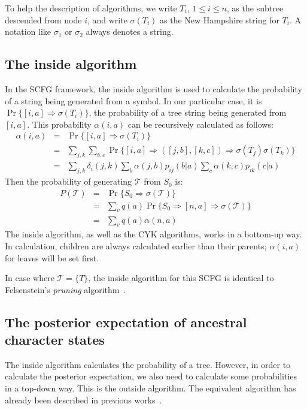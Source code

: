 \documentclass[pdftex,11pt]{article}
\begin{document}
To help the description of algorithms, we write $T_i$, $1\leq i\leq n$,
as the subtree descended from node $i$, and write $\sigma(T_i)$ as the
New Hampshire string for $T_i$.  A notation like $\sigma_1$ or
$\sigma_2$ always denotes a string.

\subsection{The inside algorithm}
In the SCFG framework, the inside algorithm is used to calculate the
probability of a string being generated from a symbol. In our particular
case, it is $\Pr\{[i,a]\Rightarrow\sigma(T_i)\}$, the probability of a
tree string being generated from $[i,a]$. This probability $\alpha(i,a)$
can be recursively calculated as follows:
\begin{eqnarray}\label{equ:in}
  \alpha(i,a)&=&\Pr\{[i,a]\Rightarrow\sigma(T_i)\}\nonumber\\
  &=&\sum_{j,k}\sum_{b,c}\Pr\{[i,a]\Rightarrow([j,b],[k,c])\Rightarrow\sigma(T_j)\sigma(T_k)\}\nonumber\\
  &=&\sum_{j,k}{\delta_i(j,k)\sum_b{\alpha(j,b)p_{ij}(b|a)}\sum_c{\alpha(k,c)p_{ik}(c|a)}}
\end{eqnarray}
Then the probability of generating $\mathcal{T}$ from $S_0$ is:
\begin{eqnarray}
  P(\mathcal{T})&=&\Pr\{S_0\Rightarrow\sigma(\mathcal{T})\}\nonumber\\
  &=&\sum_v q(a)\Pr\{S_0\Rightarrow[n,a]\Rightarrow\sigma(\mathcal{T})\}\nonumber\\
  &=&\sum_v q(a)\alpha(n,a)
\end{eqnarray}
The inside algorithm, as well as the CYK algorithms, works in a
bottom-up way.  In calculation, children are always calculated earlier
than their parents; $\alpha(i,a)$ for leaves will be set first.

In case where $\mathcal{T}=\{T\}$, the inside algorithm for this SCFG is
identical to Felsenstein's {\it pruning}
algorithm~\citep{felsenstein81a}.

\subsection{The posterior expectation of ancestral character states}

The inside algorithm calculates the probability of a tree. However, in
order to calculate the posterior expectation, we also need to calculate
some probabilities in a top-down way. This is the outside algorithm.
The equivalent algorithm has already been described in previous
works~\citep{em-holmes02,em-siepel04}.
\end{document}
